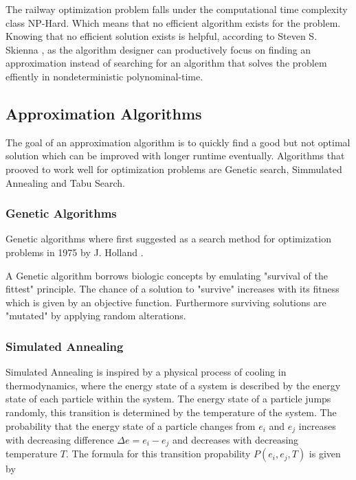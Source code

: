 \documentclass[a4paper,12pt,parskip]{article}
\begin{document}
The railway optimization problem falls under the computational time complexity 
class NP-Hard. Which means that no efficient algorithm exists for the problem. 
Knowing that no efficient solution exists is helpful, according to 
Steven S. Skienna \cite{skienna08}, as the algorithm designer can productively 
focus on finding an approximation instead of searching for an algorithm that 
solves the problem effiently in nondeterministic polynominal-time.

\subsection{Approximation Algorithms}

The goal of an approximation algorithm is to quickly find a good but not optimal 
solution which can be improved with longer runtime eventually. Algorithms that 
prooved to work well for optimization problems are Genetic search, Simmulated 
Annealing and Tabu Search.

\subsubsection{Genetic Algorithms}

Genetic algorithms where first suggested as a search method for optimization 
problems in 1975 by J. Holland \cite{holland1975}.

A Genetic algorithm borrows biologic concepts by emulating "survival of the 
fittest" principle. The chance of a solution to "survive" increases with its 
fitness which is given by an objective function. Furthermore surviving solutions
are "mutated" by applying random alterations.

\subsubsection{Simulated Annealing}

Simulated Annealing is inspired by a physical process of cooling in thermodynamics, 
where the energy state of a system is described by the energy state of each 
particle within the system. The energy state of a particle jumps randomly, 
this transition is determined by the temperature of the system. The probability 
that the energy state of a particle changes from $e_i$ and $e_j$ increases with 
decreasing difference $\Delta e = e_i - e_j$ and decreases with decreasing 
temperature $T$. The formula for this transition propability $P(e_i, e_j, T)$ is 
given by
\end{document}
